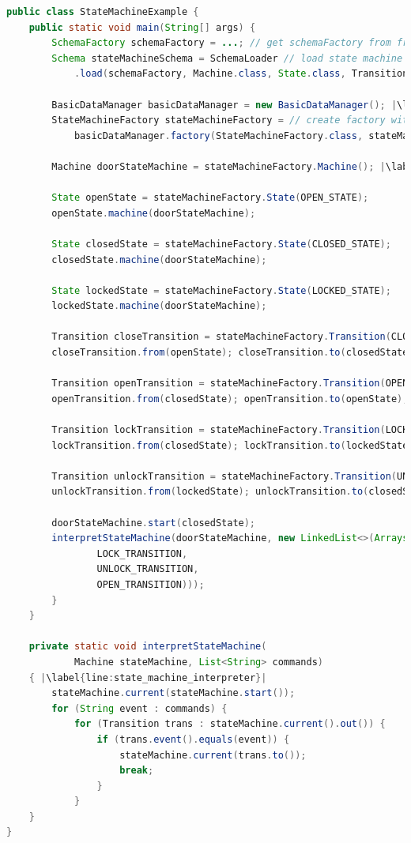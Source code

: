 \begin{sourcecode}
	\begin{lstlisting}[language=Java, escapechar=|]
public class StateMachineExample {
	public static void main(String[] args) {
		SchemaFactory schemaFactory = ...; // get schemaFactory from framework
		Schema stateMachineSchema = SchemaLoader // load state machine schema
			.load(schemaFactory, Machine.class, State.class, Transition.class); |\label{line:state_schemaMachineSchema}|

		BasicDataManager basicDataManager = new BasicDataManager(); |\label{line:state_meaning_full_code}|
		StateMachineFactory stateMachineFactory = // create factory with data manager
			basicDataManager.factory(StateMachineFactory.class, stateMachineSchema);

		Machine doorStateMachine = stateMachineFactory.Machine(); |\label{line:state_machine_creation_basic}|

		State openState = stateMachineFactory.State(OPEN_STATE);
		openState.machine(doorStateMachine);

		State closedState = stateMachineFactory.State(CLOSED_STATE);
		closedState.machine(doorStateMachine);

		State lockedState = stateMachineFactory.State(LOCKED_STATE);
		lockedState.machine(doorStateMachine);

		Transition closeTransition = stateMachineFactory.Transition(CLOSE_TRANSITION);
		closeTransition.from(openState); closeTransition.to(closedState);

		Transition openTransition = stateMachineFactory.Transition(OPEN_TRANSITION);
		openTransition.from(closedState); openTransition.to(openState);

		Transition lockTransition = stateMachineFactory.Transition(LOCK_TRANSITION);
		lockTransition.from(closedState); lockTransition.to(lockedState);

		Transition unlockTransition = stateMachineFactory.Transition(UNLOCK_TRANSITION);
		unlockTransition.from(lockedState); unlockTransition.to(closedState);

		doorStateMachine.start(closedState);
		interpretStateMachine(doorStateMachine, new LinkedList<>(Arrays.asList(
				LOCK_TRANSITION,
				UNLOCK_TRANSITION,
				OPEN_TRANSITION)));
		}	
	}

	private static void interpretStateMachine(
			Machine stateMachine, List<String> commands) 
	{ |\label{line:state_machine_interpreter}|
	    stateMachine.current(stateMachine.start());
		for (String event : commands) {
			for (Transition trans : stateMachine.current().out()) {
				if (trans.event().equals(event)) {
					stateMachine.current(trans.to());
					break;
				}
			}
	}
}
	\end{lstlisting}
	\caption{Door state machine}
	\label{lst:Door_state_machine}
\end{sourcecode}

